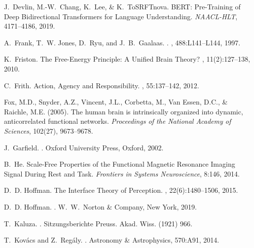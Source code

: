 \documentclass[12pt,a4paper]{article}
\begin{document}
\begin{thebibliography}{99}
J.~Devlin, M.-W.~Chang, K.~Lee, \& K.~ToSRFTnova.
\newblock BERT: Pre-Training of Deep Bidirectional Transformers for Language Understanding.
\newblock \emph{NAACL-HLT}, 4171--4186, 2019.

A.~Frank, T.~W. Jones, D.~Ryu, and J.~B.~Gaalaas.
.
, 488:L141--L144, 1997.

K.~Friston.
\newblock The Free-Energy Principle: A Unified Brain Theory?
, 11(2):127--138, 2010.

C.~Frith.
\newblock Action, Agency and Responsibility.
, 55:137--142, 2012.

Fox, M.D., Snyder, A.Z., Vincent, J.L., Corbetta, M., Van Essen, D.C., \& Raichle, M.E. (2005).
\newblock The human brain is intrinsically organized into dynamic, anticorrelated functional networks.
\newblock \emph{Proceedings of the National Academy of Sciences}, 102(27), 9673--9678.

J.~Garfield.
.
\newblock Oxford University Press, Oxford, 2002.

B.~He.
\newblock Scale-Free Properties of the Functional Magnetic Resonance Imaging Signal During Rest and Task.
\newblock \emph{Frontiers in Systems Neuroscience}, 8:146, 2014.

D.~D. Hoffman.
\newblock The {Interface} {Theory} of {Perception}.
, 22(6):1480--1506, 2015.

D.~D. Hoffman.
.
\newblock W.~W.~Norton \& Company, New York, 2019.

T.~Kaluza.
.
\newblock Sitzungsberichte Preuss. Akad. Wiss. (1921) 966.

T.~Kovács and Z.~Regály.
.
\newblock Astronomy \& Astrophysics, 570:A91, 2014.


\end{thebibliography}
\end{document}
